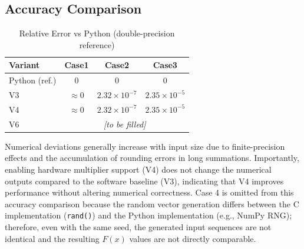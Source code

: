 \subsection{Accuracy Comparison}

\begin{table}[H]
\centering
\caption{Relative Error vs Python (double-precision reference)}
\begin{tabular}{lccc}
\toprule
Variant & Case1 & Case2 & Case3 \\
\midrule
Python (ref.) & 0 & 0 & 0 \\
V3 & $\approx 0$ & $2.32\times 10^{-7}$ & $2.35\times 10^{-5}$ \\
V4 & $\approx 0$ & $2.32\times 10^{-7}$ & $2.35\times 10^{-5}$ \\
V6 & \multicolumn{3}{c}{\textit{[to be filled]}} \\
\bottomrule
\end{tabular}
\end{table}

Numerical deviations generally increase with input size due to finite-precision effects and the accumulation of rounding errors in long summations. 
Importantly, enabling hardware multiplier support (V4) does not change the numerical outputs compared to the software baseline (V3), indicating that V4 improves performance without altering numerical correctness. 
Case 4 is omitted from this accuracy comparison because the random vector generation differs between the C implementation (\texttt{rand()}) and the Python implementation (e.g., NumPy RNG); therefore, even with the same seed, the generated input sequences are not identical and the resulting $F(x)$ values are not directly comparable.